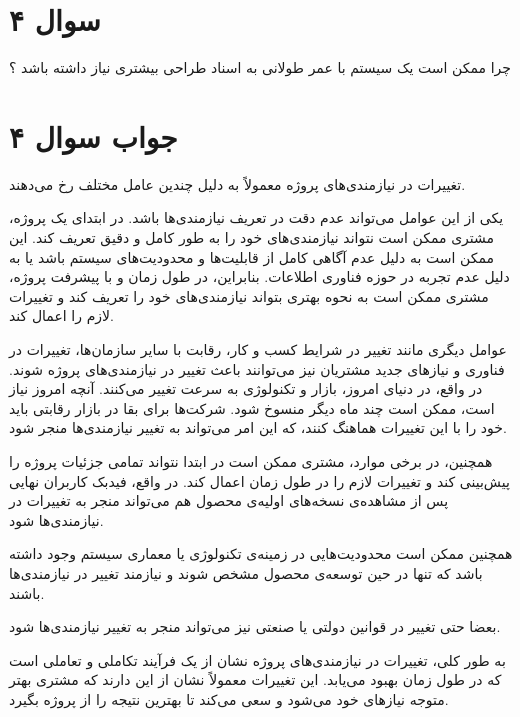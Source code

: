 \section*{سوال ۴}

چرا ممکن است یک سیستم با عمر طولانی به اسناد طراحی بیشتری نیاز داشته باشد ؟

\section*{جواب سوال ۴}

تغییرات در نیازمندی‌های پروژه معمولاً به دلیل چندین عامل مختلف رخ می‌دهند.


یکی از این عوامل می‌تواند عدم دقت در تعریف نیازمندی‌ها باشد. در ابتدای یک پروژه، مشتری ممکن است نتواند نیازمندی‌های خود را به طور کامل و دقیق تعریف کند. این ممکن است به دلیل عدم آگاهی کامل از قابلیت‌ها و محدودیت‌های سیستم باشد یا به دلیل عدم تجربه در حوزه فناوری اطلاعات. بنابراین، در طول زمان و با پیشرفت پروژه، مشتری ممکن است به نحوه بهتری بتواند نیازمندی‌های خود را تعریف کند و تغییرات لازم را اعمال کند.


عوامل دیگری مانند تغییر در شرایط کسب و کار، رقابت با سایر سازمان‌ها، تغییرات در فناوری و نیازهای جدید مشتریان نیز می‌توانند باعث تغییر در نیازمندی‌های پروژه شوند. در واقع، در دنیای امروز، بازار و تکنولوژی به سرعت تغییر می‌کنند. آنچه امروز نیاز است، ممکن است چند ماه دیگر منسوخ شود. شرکت‌ها برای بقا در بازار رقابتی باید خود را با این تغییرات هماهنگ کنند، که این امر می‌تواند به تغییر نیازمندی‌ها منجر شود.


همچنین، در برخی موارد، مشتری ممکن است در ابتدا نتواند تمامی جزئیات پروژه را پیش‌بینی کند و تغییرات لازم را در طول زمان اعمال کند. در واقع، فیدبک کاربران نهایی پس از مشاهده‌ی نسخه‌های اولیه‌ی محصول هم می‌تواند منجر به تغییرات در نیازمندی‌ها شود.


همچنین ممکن است محدودیت‌هایی در زمینه‌ی تکنولوژی یا معماری سیستم وجود داشته باشد که تنها در حین توسعه‌ی محصول مشخص شوند و نیازمند تغییر در نیازمندی‌ها باشند.


بعضا حتی تغییر در قوانین دولتی یا صنعتی نیز می‌تواند منجر به تغییر نیازمندی‌ها شود.


به طور کلی، تغییرات در نیازمندی‌های پروژه نشان از یک فرآیند تکاملی و تعاملی است که در طول زمان بهبود می‌یابد. این تغییرات معمولاً نشان از این دارند که مشتری بهتر متوجه نیازهای خود می‌شود و سعی می‌کند تا بهترین نتیجه را از پروژه بگیرد.
